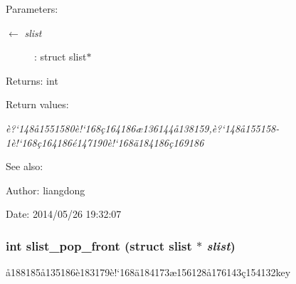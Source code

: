 \begin{Desc}
\item[Parameters:]
\begin{description}
\item[\mbox{$\leftarrow$} {\em slist}]: struct slist$\ast$ \end{description}
\end{Desc}
\begin{Desc}
\item[Returns:]int \end{Desc}
\begin{Desc}
\item[Return values:]
\begin{description}
\item[{\em \`{e}?`148\aa{}1551580\`{e}!`168\c{c}164186\ae{}136144\aa{}138159,\`{e}?`148\aa{}155158-1\`{e}!`168\c{c}164186\'{e}147190\`{e}!`168\"{a}184186\c{c}169186}]\end{description}
\end{Desc}
\begin{Desc}
\item[See also:]\end{Desc}
\begin{Desc}
\item[Author:]liangdong \end{Desc}
\begin{Desc}
\item[Date:]2014/05/26 19:32:07 \end{Desc}
\subsubsection{\setlength{\rightskip}{0pt plus 5cm}int slist\_\-pop\_\-front (struct slist $\ast$ {\em slist})}\label{slist_8h_a6}


\aa{}188185\aa{}135186\`{e}183179\`{e}!`168\"{a}184173\ae{}156128\aa{}176143\c{c}154132key 

